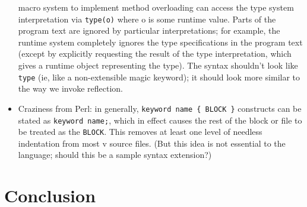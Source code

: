 \documentclass[11pt,notitlepage,twocolumn]{article}
\newcommand{\vlang}{\textsf{v}\xspace}
\begin{document}
\begin{itemize}
  macro system to implement method overloading can access the type
  system interpretation via \texttt{type(o)} where o is some runtime
  value.  Parts of the program text are ignored by particular
  interpretations; for example, the runtime system completely ignores
  the type specifications in the program text (except by explicitly
  requesting the result of the type interpretation, which gives
  a runtime object representing the type).  The syntax shouldn't look
  like \texttt{type} (ie, like a non-extensible magic keyword); it
  should look more similar to the way we invoke reflection.
\item Craziness from Perl: in generally, \texttt{keyword name \{ BLOCK \}}
  constructs can be stated as \texttt{keyword name;}, which in effect
  causes the rest of the block or file to be treated as the \texttt{BLOCK}.
  This removes at least one level of needless indentation from most
  \vlang source files. (But this idea is not essential to the
  language; should this be a sample syntax extension?)
\end{itemize}

\section{Conclusion}


\end{document}
